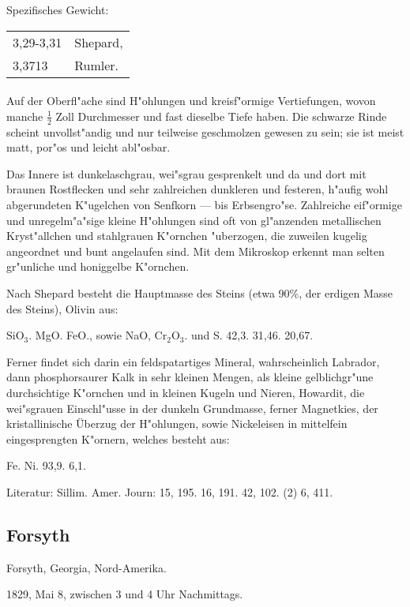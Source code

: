 \documentclass[a4paper, 11pt, oneside]{article}
\begin{document}
Spezifisches Gewicht: 
\begin{table}[!ht]
    \centering
    \begin{tabular}{l l}
        3,29-3,31 & Shepard,\\
        3,3713 & Rumler.
    \end{tabular}
\end{table}
\paragraph{}
Auf der Oberfl"ache sind H"ohlungen und kreisf"ormige Vertiefungen, wovon manche $\frac{1}{2}$ Zoll Durchmesser und fast dieselbe Tiefe haben. Die schwarze Rinde scheint unvollst"andig und nur teilweise geschmolzen gewesen zu sein; sie ist meist matt, por"os und leicht abl"osbar.

Das Innere ist dunkelaschgrau, wei"sgrau gesprenkelt und da und dort mit braunen Rostflecken und sehr zahlreichen dunkleren und festeren, h"aufig wohl abgerundeten K"ugelchen von Senfkorn --- bis Erbsengro"se. Zahlreiche eif"ormige und unregelm"a"sige kleine H"ohlungen sind oft von gl"anzenden metallischen Kryst"allchen und stahlgrauen K"ornchen "uberzogen, die zuweilen kugelig angeordnet und bunt angelaufen sind. Mit dem Mikroskop erkennt man selten gr"unliche und honiggelbe K"ornchen.

Nach Shepard besteht die Hauptmasse des Steins (etwa 90\%, der erdigen Masse des Steins), Olivin aus:

SiO$_{3}$. MgO. FeO., sowie NaO, Cr$_{2}$O$_{3}$. und S.  
42,3. 31,46. 20,67.

Ferner findet sich darin ein feldspatartiges Mineral, wahrscheinlich Labrador, dann phosphorsaurer Kalk in sehr kleinen Mengen, als kleine gelblichgr"une durchsichtige K"ornchen und in kleinen Kugeln und Nieren, Howardit, die wei"sgrauen Einschl"usse in der dunkeln Grundmasse, ferner Magnetkies, der kristallinische Überzug der H"ohlungen, sowie Nickeleisen in mittelfein eingesprengten K"ornern, welches besteht aus:

Fe. Ni.  
93,9. 6,1.

Literatur: Sillim. Amer. Journ: 15, 195. 16, 191. 42, 102. (2) 6, 411.

\subsection{Forsyth}

Forsyth, Georgia, Nord-Amerika.

1829, Mai 8, zwischen 3 und 4 Uhr Nachmittags.
\end{document}
